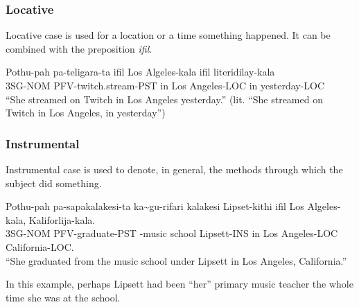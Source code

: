 \subsubsection{Locative}
Locative case is used for a location or a time something happened.
It can be combined with the preposition \textit{ifil}.

\begin{exe}
\ex{} \gll{}Pothu-pah pa-teligara-ta        ifil Los Algeles-kala ifil literidilay-kala\\
            3SG-NOM   PFV-twitch.stream-PST in   Los Angeles-LOC  in   yesterday-LOC\\
    \glt{}``She streamed on Twitch in Los Angeles yesterday.'' (lit. ``She streamed on Twitch in Los Angeles, in yesterday'')
\end{exe}

\subsubsection{Instrumental}
Instrumental case is used to denote, in general, the methods through which the subject did something.

\begin{exe}
\ex{} \gll{}Pothu-pah pa-sapakalakesi-ta ka\~{}gu-rifari  kalakesi Lipset-kithi ifil Los Algeles-kala, Kaliforlija-kala.\\
            3SG-NOM   PFV-graduate-PST   \agradj{}-music  school   Lipsett-INS  in   Los Angeles-LOC   California-LOC.\\
    \glt{}``She graduated from the music school under Lipsett in Los Angeles, California.''
\end{exe}
In this example, perhaps Lipsett had been ``her'' primary music teacher the whole time she was at the school.

\newpage{}
